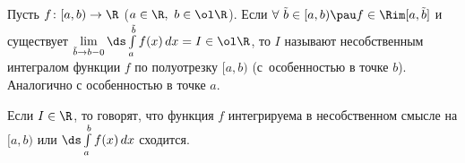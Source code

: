 
   	Пусть $f\colon[a,b)\to\R$ ($a\in\R,\ b\in\ol\R$). Если $\forall\  \tilde b\in[a,b)\pau f\in\Rim[a,\tilde b]$ и существует $\lim\limits_{\tilde b\to b-0}
   	\ds\int\limits_a^{\tilde b}f(x)\,dx=I\in\ol\R$, то
   	$I$ называют несобственным интегралом функции $f$ по полуотрезку $[a,b)$ (с~особенностью в точке $b$). Аналогично с особенностью в точке $a$.
   	
   	Если $I\in\R$, то говорят, что функция $f$ интегрируема в несобственном смысле на $[a,b)$ или $\ds\int\limits_a^bf(x)\,dx$ сходится.
   